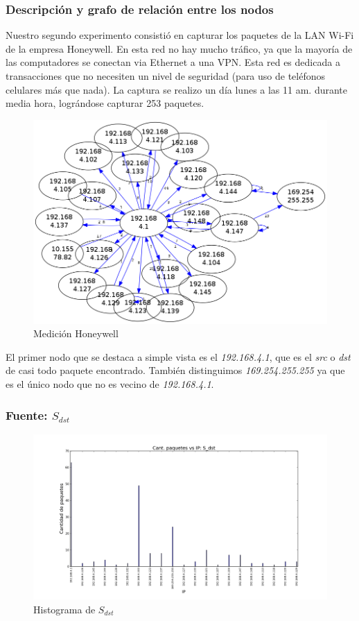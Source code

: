 \subsubsection{Descripción y grafo de relación entre los nodos}

Nuestro segundo experimento consistió en capturar los paquetes de la LAN Wi-Fi de la empresa Honeywell. En esta red no hay mucho tráfico, ya que la mayoría de las computadores se conectan via Ethernet a una VPN. Esta red es dedicada a transacciones que no necesiten un nivel de seguridad (para uso de teléfonos celulares más que nada). La captura se realizo un día lunes a las 11 am. durante media hora, lográndose capturar 253 paquetes.  

\begin{figure}[H]
 \begin{center}
  \includegraphics[width=0.7\linewidth]{../imgs/red-honeywell_red.png}
  \caption{Medición Honeywell}
 \end{center}
\end{figure}

El primer nodo que se destaca a simple vista es el \emph{192.168.4.1}, que es el \emph{src} o \emph{dst} de casi todo paquete encontrado.
También distinguimos \emph{169.254.255.255} ya que es el único nodo que no es vecino de \emph{192.168.4.1}.

\subsubsection{Fuente: $S_{dst}$}

\begin{figure}[H]\centering
    \includegraphics[width=0.8\linewidth]{../imgs/red-honeywell_S_dst_hist.png}
    \caption{Histograma de $S_{dst}$}\label{fig:Honeywell-dst-hist}
\end{figure}

